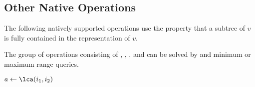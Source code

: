 \begin{algorithm}
\begin{algorithmic}
	\State {}
\EndFunction
\end{algorithmic}
\end{algorithm}

\subsection{Other Native Operations}\label{ss:bp-other}

The following natively supported operations use the property that a subtree of $v$ is fully contained in the representation of $v$.

\begin{algorithm}
\begin{algorithmic}
	\State {}
\EndFunction
\end{algorithmic}
\end{algorithm}

\begin{algorithm}
\begin{algorithmic}
	\State {}
\EndFunction
\end{algorithmic}
\end{algorithm}

\begin{algorithm}
\begin{algorithmic}
	\State {}
\EndFunction
\end{algorithmic}
\end{algorithm}

The group of operations consisting of \lca{}, \distance{}, \deepestVertex{}, and \hei{} can be solved by \enclose{} and minimum or maximum range queries.

\begin{algorithm}
\begin{algorithmic}
		\State {}
		\State {}
	\Else
		\State {}
	\EndIf
\EndFunction
\end{algorithmic}
\end{algorithm}

\begin{algorithm}
\begin{algorithmic}
	\State $a \gets \lca(i_1, i_2)$
	\State {}
\EndFunction
\end{algorithmic}
\end{algorithm}

